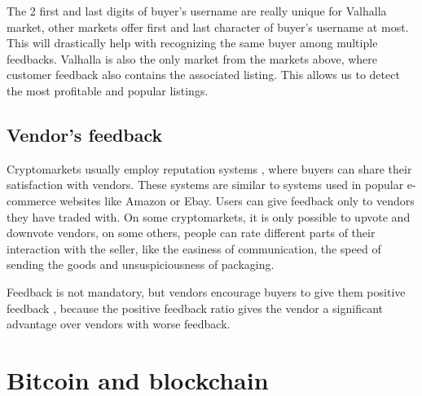 \documentclass[
  digital, %
  table,   %
  lof,     %
  lot,     %
  oneside
]{fithesis3}
\begin{document}
The 2 first and last digits of buyer's username are really unique for Valhalla market,
other markets offer first and last character of buyer's username at most.
This will drastically help with recognizing the same buyer among multiple feedbacks.
Valhalla is also the only market from the markets above, where customer feedback also contains the
associated listing.
This allows us to detect the most profitable and popular listings.

\subsection{Vendor's feedback}

Cryptomarkets usually employ reputation systems \parencite{resnick2000reputation},
where buyers can share their satisfaction with vendors.
These systems are similar to systems used in popular e-commerce websites like Amazon or Ebay.
Users can give feedback only to vendors they have traded with.
On some cryptomarkets, it is only possible to upvote and downvote vendors,
on some others, people can rate different parts of their interaction with the seller,
like the easiness of communication,
the speed of sending the goods and unsuspiciousness of packaging.

Feedback is not mandatory, but vendors encourage buyers to give them positive feedback
\parencite{aldridge2014not}\parencite{soska2015measuring}, because the positive feedback
ratio gives the vendor a significant advantage over vendors with worse feedback.

\section{Bitcoin and blockchain}
\end{document}
